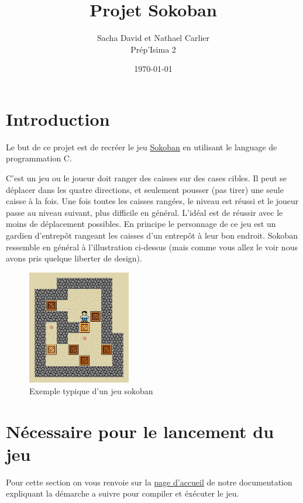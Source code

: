 \documentclass[french, 12pt]{article}
\title{Projet Sokoban}
\author{Sacha David et Nathael Carlier\\
        Prép'Isima 2}
\date{\today}
\begin{document}
\maketitle

\tableofcontents

\section{Introduction}

    Le but de ce projet est de recréer le jeu \href{https://fr.wikipedia.org/wiki/Sokoban}{Sokoban} en utilisant le language de programmation C. 

    C'est un jeu ou le joueur doit ranger des caisses sur des cases cibles. Il peut se déplacer dans les quatre directions, et seulement pousser (pas tirer) une seule caisse à la fois. Une fois toutes les caisses rangées, le niveau est réussi et le joueur passe au niveau suivant, plus difficile en général. L'idéal est de réussir avec le moins de déplacement possibles. En principe le personnage de ce jeu est un gardien d'entrepôt rangeant les caisses d'un entrepôt à leur bon endroit. Sokoban ressemble en général à l'illustration ci-dessus (mais comme vous allez le voir nous avons pris quelque liberter de design).

    \begin{figure}[h]
        \centering
        \includegraphics[width=0.4\textwidth]{illustration/base_sokoban.png}
        \caption{Exemple typique d'un jeu sokoban}
    \end{figure}

\section{Nécessaire pour le lancement du jeu}

Pour cette section on vous renvoie sur la \href{../doc/redirect.html}{page d'accueil} de notre documentation expliquant la démarche a suivre pour compiler et éxécuter le jeu.
\end{document}
